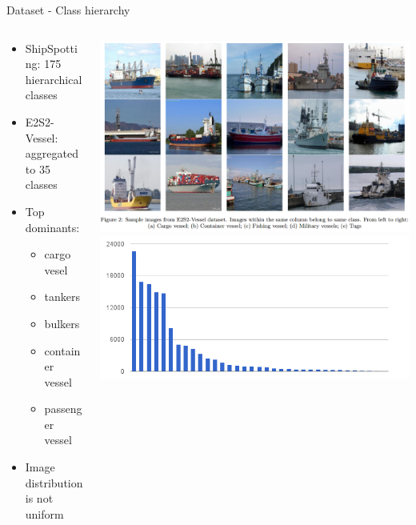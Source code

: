 \documentclass[slidestop,compress,mathserif,notes]{beamer}
\begin{document}
\begin{frame}{Dataset - Class hierarchy}
\begin{columns}
    \begin{column}[T]{0.45\textwidth}
        \begin{itemize}
            \item ShipSpotting: 175 hierarchical classes
            \item E2S2-Vessel: aggregated to 35 classes
            \pause
            \item Top dominants:
            \begin{itemize}
                \item \small{cargo vesel}
                \item \small{tankers}
                \item \small{bulkers}
                \item \small{container vessel}
                \item \small{passenger vessel}
            \end{itemize}
            \item Image distribution is not uniform
        \end{itemize}
    \end{column}
    \begin{column}[T]{0.55\textwidth}
        \includegraphics[width=\textwidth]{pic/figure.png}\\
        \includegraphics[width=\textwidth]{pic/image_dist.png}\\
    \end{column}
\end{columns}
\end{frame}
\end{document}
